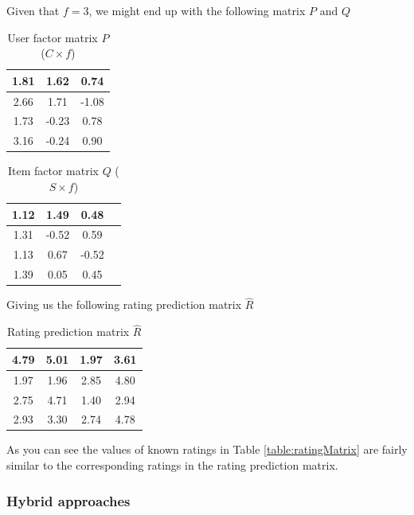 Given that $f = 3$, we might end up with the following matrix $P$ and $Q$

\begin{table}[!htbp]
\centering
\begin{tabular}{|c|c|c|}
\hline
1.81    &1.62   &0.74\\ \hline
2.66    &1.71   &-1.08\\ \hline
1.73    &-0.23  &0.78\\ \hline
3.16    &-0.24  &0.90\\ \hline
\end{tabular}
\label{table:ItemFeature}
\caption{User factor matrix $P$ ($C \times f$)}
\end{table}

\begin{table}[!htbp]
\centering
\begin{tabular}{|c|c|c|c|}
\hline
1.12    &   1.49    &   0.48\\ \hline
1.31    &-0.52  &0.59\\ \hline
1.13    &0.67&  -0.52\\ \hline
1.39    &0.05&  0.45\\ \hline
\end{tabular}
\label{table:UserFeature}
\caption{Item factor matrix $Q$ ($S \times f$)}
\end{table}

Giving us the following rating prediction matrix $\hat{R}$

\begin{table}[!htbp]
\centering
\begin{tabular}{|c|c|c|c|}
\hline
4.79    &5.01   &1.97   &3.61 \\ \hline
1.97    &1.96   &2.85   &4.80 \\ \hline
2.75    &4.71   &1.40   &2.94 \\ \hline
2.93    &3.30   &2.74   &4.78 \\ \hline
\end{tabular}
\label{table:PredictionMatrix}
\caption{Rating prediction matrix $\hat{R}$}
\end{table}

As you can see the values of known ratings in Table \ref{table:ratingMatrix}
are fairly similar to the corresponding ratings in the rating prediction
matrix.

\subsubsection{Hybrid approaches}

